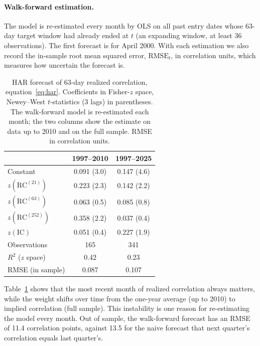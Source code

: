 \paragraph{Walk-forward estimation.} The model is re-estimated every month by OLS on all past entry dates whose 63-day target window had already ended at $t$ (an expanding window, at least 36 observations). The first forecast is for April 2000. With each estimation we also record the in-sample root mean squared error, $\mathrm{RMSE}_t$, in correlation units, which measures how uncertain the forecast is.

\begin{table}[t]
  \centering
  \small
  \caption{HAR forecast of 63-day realized correlation, equation~\eqref{eq:har}. Coefficients in Fisher-$z$ space, Newey--West $t$-statistics (3 lags) in parentheses. The walk-forward model is re-estimated each month; the two columns show the estimate on data up to 2010 and on the full sample. RMSE in correlation units.}
  \label{tab:har}
  \begin{tabular}{lcc}
    \toprule
    & 1997--2010 & 1997--2025 \\
    \midrule
    Constant                     & 0.091 (3.0) & 0.147 (4.6) \\
    $z(\mathrm{RC}^{(21)})$      & 0.223 (2.3) & 0.142 (2.2) \\
    $z(\mathrm{RC}^{(63)})$      & 0.063 (0.5) & 0.085 (0.8) \\
    $z(\mathrm{RC}^{(252)})$     & 0.358 (2.2) & 0.037 (0.4) \\
    $z(\mathrm{IC})$             & 0.051 (0.4) & 0.227 (1.9) \\
    \midrule
    Observations                 & 165 & 341 \\
    $R^2$ ($z$ space)            & 0.42 & 0.23 \\
    RMSE (in sample)             & 0.087 & 0.107 \\
    \bottomrule
  \end{tabular}
\end{table}

Table~\ref{tab:har} shows that the most recent month of realized correlation always matters, while the weight shifts over time from the one-year average (up to 2010) to implied correlation (full sample). This instability is one reason for re-estimating the model every month. Out of sample, the walk-forward forecast has an RMSE of 11.4 correlation points, against 13.5 for the naive forecast that next quarter's correlation equals last quarter's.

